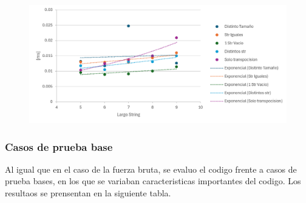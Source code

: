 \begin{figure}[H]
    \centering
    \includegraphics[width=1\linewidth]{AlgoReportTemplate-main//images/graphDP.png}
    \label{fig:enter-label}
\end{figure}

\subsubsection*{Casos de prueba base}

Al igual que en el caso de la fuerza bruta, se evaluo el codigo frente a casos de prueba bases, en los que se variaban caracteristicas importantes del codigo.
Los resultaos se prensentan en la siguiente tabla.

